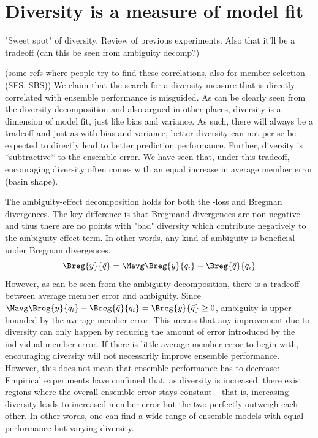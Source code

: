 \documentclass[
    a4paper, %
	fontsize=10pt, %
	twoside=false, %
]{kaobook}
\begin{document}

\section{Diversity is a measure of model fit}
"Sweet spot" of diversity. Review of previous experiments. 
Also that it'll be a tradeoff (can this be seen from ambiguity decomp?)

(some refs where people try to find these correlations, also for member selection (SFS, SBS))
We claim that the search for a diversity measure that is directly correlated with ensemble performance is misguided. As can be clearly seen from the diversity decomposition and also argued in other places, diversity is a dimension of model fit, just like bias and variance. As such, there will always be a tradeoff and just as with bias and variance, better diversity can not per se be expected to directly lead to better prediction performance. Further, diversity is *subtractive* to the ensemble error. We have seen that, under this tradeoff, encouraging diversity often comes with an equal increase in average member error (basin shape). 

The ambiguity-effect decomposition holds for both the \zeroone-loss and Bregman divergences. The key difference is that Bregmand divergences are non-negative and thus there are no points with "bad" diversity which contribute negatively to the ambiguity-effect term. In other words, any kind of ambiguity is beneficial under Bregman divergences.
$$
\Breg{y}{\bar{q}} = \Mavg \Breg{y}{q_{i}} - \Breg{\bar{q}}{q_{i}}
$$
However, as can be seen from the ambiguity-decomposition, there is a tradeoff between average member error and ambiguity. Since 
$ \Mavg \Breg{y}{q_{i}} - \Breg{\bar{q}}{q_{i}} = \Breg{y}{\bar{q}} \geq 0$, 
ambiguity is upper-bounded by the average member error. This means that any improvement due to diversity can only happen by reducing the amount of error introduced by the individual member error. If there is little average member error to begin with, encouraging diversity will not necessarily improve ensemble performance. However, this does not mean that ensemble performance has to decrease: Empirical experiments \cite{buschj-etc} have confimed that, as diversity is increased, there exist regions where the overall ensemble error stays constant -- that is, increasing diversity leads to increased member error but the two perfectly outweigh each other. In other words, one can find a wide range of ensemble models with equal performance but varying diversity.
\end{document}
